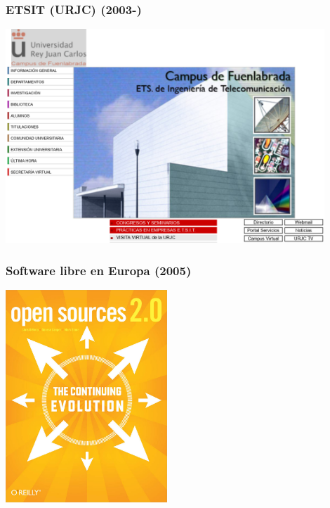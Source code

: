 \begin{frame}[fragile]
  \frametitle{ETSIT (URJC) (2003-)}

  \begin{center}
  \includegraphics[width=12cm]{figs/etsit-urjc}
  \end{center}  
  
\end{frame}

\begin{frame}[fragile]
  \frametitle{Software libre en Europa (2005)}

  \begin{center}
  \includegraphics[height=8cm]{figs/opensources}
  \end{center}  
  
\end{frame}

